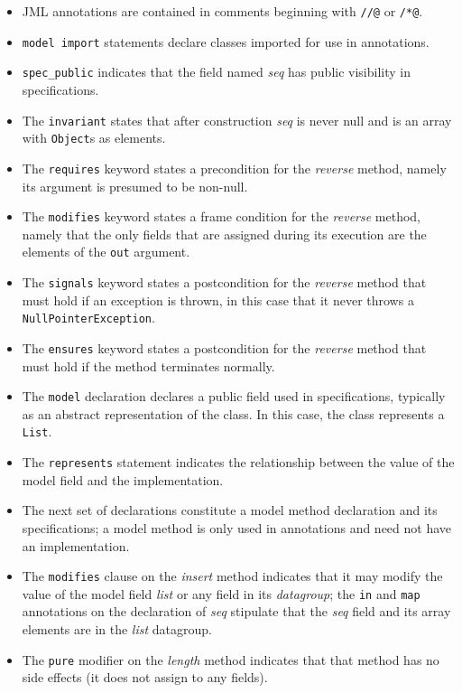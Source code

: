 \documentclass{llncs}
\begin{document}
\begin{itemize}
\item JML annotations are contained in comments beginning with
\texttt{//@} or \texttt{/*@}.
\item \texttt{model import} statements declare classes imported for
use in annotations.
\item \texttt{spec\_public} indicates that the field named {\em seq}
has public visibility in specifications.
\item The \texttt{invariant} states that after construction {\em seq}
is never null and is an array with \texttt{Object}s as elements.
\item The \texttt{requires} keyword states a precondition for the {\em
reverse} method, namely its argument is presumed to be non-null.
\item The \texttt{modifies} keyword states a frame condition for the
{\em reverse} method, namely that the only fields that are assigned
during its execution are the elements of the \texttt{out} argument.
\item The \texttt{signals} keyword states a postcondition for the {\em
reverse} method that must hold if an exception is thrown, in this case
that it never throws a \texttt{NullPointerException}.
\item The \texttt{ensures} keyword states a postcondition for the {\em
reverse} method that must hold if the method terminates normally.
\item The \texttt{model} declaration declares a public field used in
specifications, typically as an abstract representation of the class.
In this case, the class represents a \texttt{List}.
\item The \texttt{represents} statement indicates the relationship
between the value of the model field and the implementation.
\item The next set of declarations constitute a model method
declaration and its specifications; a model method is only used in
annotations and need not have an implementation.
\item The \texttt{modifies} clause on the {\em insert} method
indicates that it may modify the value of the model field {\em list}
or any field in its {\em datagroup}; the \texttt{in} and \texttt{map}
annotations on the declaration of {\em seq} stipulate that the {\em
seq} field and its array elements are in the {\em list} datagroup.
\item The \texttt{pure} modifier on the {\em length} method indicates
that that method has no side effects (it does not assign to any
fields).
\end{itemize}
\end{document}
